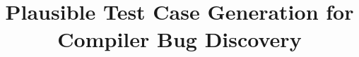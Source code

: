 



\title{Plausible Test Case Generation for Compiler Bug Discovery}

\maketitle















\printbibliography


